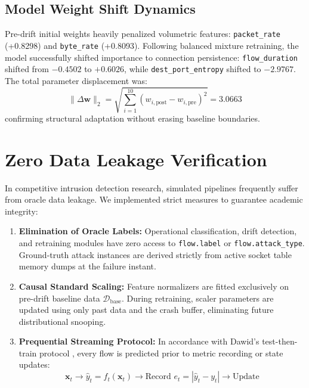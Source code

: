 \documentclass[conference]{IEEEtran}
\begin{document}
\subsection{Model Weight Shift Dynamics}
Pre-drift initial weights heavily penalized volumetric features: \texttt{packet\_rate} (+0.8298) and \texttt{byte\_rate} (+0.8093). Following balanced mixture retraining, the model successfully shifted importance to connection persistence: \texttt{flow\_duration} shifted from $-0.4502$ to $+0.6026$, while \texttt{dest\_port\_entropy} shifted to $-2.9767$. The total parameter displacement was:
\begin{equation}
\|\Delta \mathbf{w}\|_2 = \sqrt{\sum_{i=1}^{10} (w_{i,\text{post}} - w_{i,\text{pre}})^2} = 3.0663
\end{equation}
confirming structural adaptation without erasing baseline boundaries.

\section{Zero Data Leakage Verification}
In competitive intrusion detection research, simulated pipelines frequently suffer from oracle data leakage. We implemented strict measures to guarantee academic integrity:
\begin{enumerate}
    \item \textbf{Elimination of Oracle Labels:} Operational classification, drift detection, and retraining modules have zero access to \texttt{flow.label} or \texttt{flow.attack\_type}. Ground-truth attack instances are derived strictly from active socket table memory dumps at the failure instant.
    \item \textbf{Causal Standard Scaling:} Feature normalizers are fitted exclusively on pre-drift baseline data $\mathcal{D}_{\text{base}}$. During retraining, scaler parameters are updated using only past data and the crash buffer, eliminating future distributional snooping.
    \item \textbf{Prequential Streaming Protocol:} In accordance with Dawid's test-then-train protocol \cite{dawid1984}, every flow is predicted prior to metric recording or state updates:
    \begin{equation}
    \mathbf{x}_t \longrightarrow \hat{y}_t = f_t(\mathbf{x}_t) \longrightarrow \text{Record } e_t = |\hat{y}_t - y_t| \longrightarrow \text{Update}
    \end{equation}
\end{enumerate}
\end{document}

